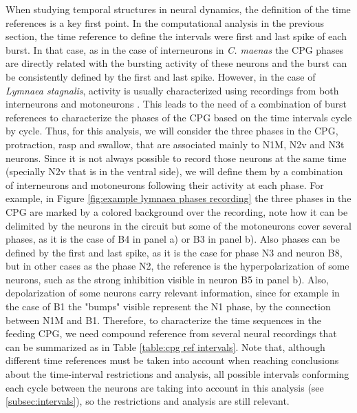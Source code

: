 When studying temporal structures in neural dynamics, the definition of the time references is a key first point. In the computational analysis in the previous section, the time reference to define the intervals were first and last spike of each burst. In that case, as in the case of interneurons in \textit{C. maenas} the CPG phases are directly related with the bursting activity of these neurons and the burst can be consistently defined by the first and last spike. However, in the case of \textit{Lymnaea stagnalis}, activity is usually characterized using recordings from both interneurons and motoneurons \parencite{elliott_interactions_1985, staras_pattern-generating_1998, benjamin_distributed_2012}. This leads to the need of a combination of burst references to characterize the phases of the CPG based on the time intervals cycle by cycle. Thus, for this analysis, we will consider the three phases in the CPG, protraction, rasp and swallow, that are associated mainly to N1M, N2v and N3t neurons. Since it is not always possible to record those neurons at the same time (specially N2v that is in the ventral side), we will define them by a combination of interneurons and motoneurons following their activity at each phase. For example, in Figure \ref{fig:example lymnaea phases recording} the three phases in the  CPG are marked by a colored background over the recording, note how it can be delimited by the neurons in the circuit but some of the motoneurons cover several phases, as it is the case of B4 in panel a) or B3 in panel b). Also phases can be defined by the first and last spike, as it is the case for phase N3 and neuron B8, but in other cases as the phase N2, the reference is the hyperpolarization of some neurons, such as the strong inhibition visible in neuron B5 in panel b). Also, depolarization of some neurons carry relevant information, since for example in the case of B1 the "bumps" visible represent the N1 phase, by the connection between N1M and B1. Therefore, to characterize the time sequences in the feeding CPG, we need compound reference from several neural recordings that can be summarized as in Table \ref{table:cpg ref intervals}. Note that, although different time references must be taken into account when reaching conclusions about the time-interval restrictions and analysis, all possible intervals conforming each cycle between the neurons are taking into account in this analysis (see \ref{subsec:intervals}), so the restrictions and analysis are still relevant.

